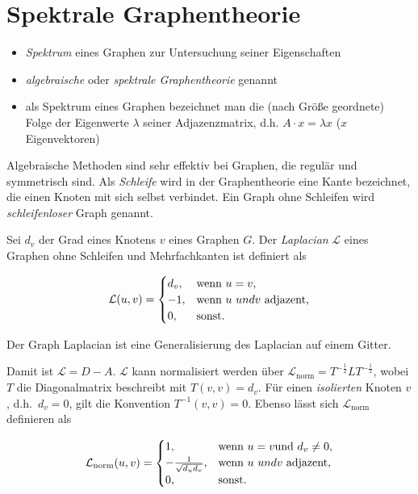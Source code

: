 \chapter{Spektrale Graphentheorie}

\begin{itemize}
  \item \emph{Spektrum} eines Graphen zur Untersuchung seiner Eigenschaften
  \item \emph{algebraische} oder \emph{spektrale Graphentheorie} genannt
  \item als Spektrum eines Graphen bezeichnet man die (nach Größe geordnete) Folge der Eigenwerte $\lambda$ seiner Adjazenzmatrix, d.h. $A \cdot x = \lambda x$ ($x$ Eigenvektoren)
\end{itemize}

Algebraische Methoden sind sehr effektiv bei Graphen, die regulär und symmetrisch sind.
Als \emph{Schleife} wird in der Graphentheorie eine Kante bezeichnet, die einen Knoten mit sich selbst verbindet.
Ein Graph ohne Schleifen wird \emph{schleifenloser} Graph genannt.

Sei $d_v$ der Grad eines Knotens $v$ eines Graphen $G$.
Der \emph{Laplacian} $\mathcal{L}$ eines Graphen ohne Schleifen und Mehrfachkanten ist definiert als

\begin{equation}
  \mathcal{L}(u, v) = \begin{cases}
    d_v, & \text{wenn }u = v\text{,}\\
    -1, & \text{wenn }u\text\ {und }v\ \text{adjazent,}\\
    0, & \text{sonst.}
  \end{cases}
\end{equation}

Der Graph Laplacian ist eine Generalisierung des Laplacian auf einem Gitter.

Damit ist $\mathcal{L} = D - A$.
$\mathcal{L}$ kann normalisiert werden über $\mathcal{L}_{\text{norm}} = T^{-\frac{1}{2}}LT^{-\frac{1}{2}}$, wobei $T$ die Diagonalmatrix beschreibt mit $T(v, v) = d_v$.
Für einen \emph{isolierten} Knoten $v$, d.h.\ $d_v = 0$, gilt die Konvention $T^{-1}(v, v) = 0$.
Ebenso lässt sich $\mathcal{L}_{\text{norm}}$ definieren als

\begin{equation}
  \mathcal{L}_{\text{norm}}(u, v) = \begin{cases}
    1, & \text{wenn }u = v\text{und }d_v \neq 0\text{,}\\
    -\frac{1}{\sqrt{d_u d_v}}, & \text{wenn }u\text\ {und }v\ \text{adjazent,}\\
    0, & \text{sonst.}
  \end{cases}
\end{equation}


